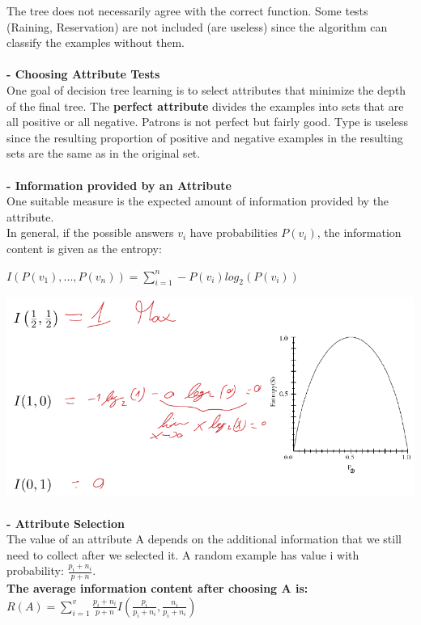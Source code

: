 \documentclass{article}
\begin{document}
The tree does not necessarily agree with the correct function. Some tests (Raining, Reservation) are not included (are useless) since the algorithm can classify the examples without them.\\\\
\textbf{- Choosing Attribute Tests}\\
One goal of decision tree learning is to select attributes that minimize the depth of the final tree. The \textbf{perfect attribute }divides the examples into sets that are all positive or all negative. Patrons is not perfect but fairly good. Type is useless since the resulting proportion of positive and negative examples in the resulting sets are the same as in the original set.\\\\
\textbf{- Information provided by an Attribute}\\
One suitable measure is the expected amount of information provided by the attribute.\\
In general, if the possible answers $v_i$ have probabilities $P(v_i)$, the information content is given as the entropy:\\
\begin{center}
$I(P(v_1),...,P(v_n)) = \sum_{i=1}^n -P(v_i)log_2(P(v_i))$
\end{center}
\includegraphics[scale=0.3]{90.png}\\\\
\textbf{- Attribute Selection}\\
The value of an attribute A depends on the additional information that we still need to collect after we selected it. A random example has value i with probability: $\frac{p_i+n_i}{p+n}$.\\
\textbf{The average information content after choosing A is: }$R(A) = \sum_{i=1}^v \frac{p_i+n_i}{p+n}I(\frac{p_i}{p_i+n_i},\frac{n_i}{p_i+n_i})$\\
\end{document}
